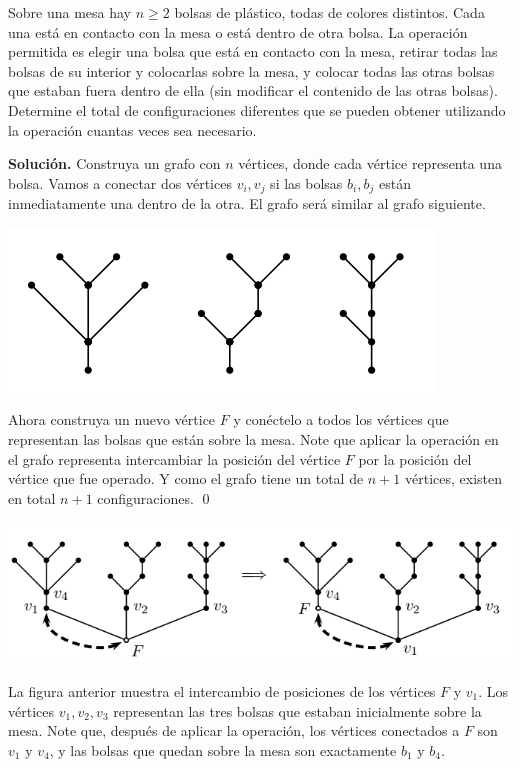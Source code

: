\documentclass[11pt]{scrartcl}
\begin{document}
\begin{example}[Rioplatense 2003]
Sobre una mesa hay \( n \geq 2 \) bolsas de plástico, todas de colores distintos. Cada una está en contacto con la mesa o está dentro de otra bolsa. La operación permitida es elegir una bolsa que está en contacto con la mesa, retirar todas las bolsas de su interior y colocarlas sobre la mesa, y colocar todas las otras bolsas que estaban fuera dentro de ella (sin modificar el contenido de las otras bolsas). Determine el total de configuraciones diferentes que se pueden obtener utilizando la operación cuantas veces sea necesario.
\end{example}
\textbf{Solución.} Construya un grafo con \( n \) vértices, donde cada vértice representa una bolsa. Vamos a conectar dos vértices \( v_i, v_j \) si las bolsas \( b_i, b_j \) están inmediatamente una dentro de la otra. El grafo será similar al grafo siguiente.
\vspace{-.3cm}
\begin{center}
\includegraphics[scale=1]{images/clase_20_1.png}
\end{center}
\vspace{-.5cm}
Ahora construya un nuevo vértice \( F \) y conéctelo a todos los vértices que representan las bolsas que están sobre la mesa. Note que aplicar la operación en el grafo representa intercambiar la posición del vértice \( F \) por la posición del vértice que fue operado. Y como el grafo tiene un total de \( n + 1 \) vértices, existen en total \( n + 1 \) configuraciones. \qed
\vspace{-.3cm}
\begin{center}
    \includegraphics[scale=1]{images/clase_20_2.png}
\end{center}
\vspace{-.5cm}
La figura anterior muestra el intercambio de posiciones de los vértices \( F \) y \( v_1 \). Los vértices \( v_1, v_2, v_3 \) representan las tres bolsas que estaban inicialmente sobre la mesa. Note que, después de aplicar la operación, los vértices conectados a \( F \) son \( v_1 \) y \( v_4 \), y las bolsas que quedan sobre la mesa son exactamente \( b_1 \) y \( b_4 \).
\end{document}
